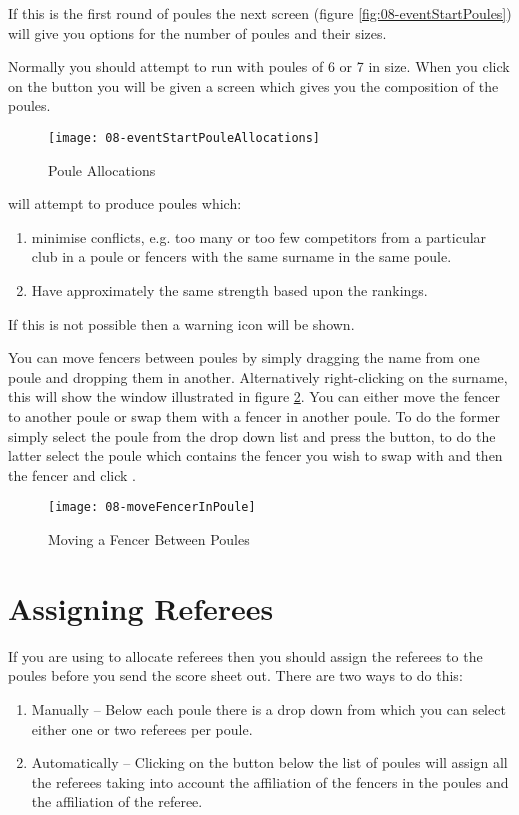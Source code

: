 \documentclass[a4paper,11pt]{memoir}
\begin{document}
If this is the first round of poules the next screen (figure \ref{fig:08-eventStartPoules}) will give you options for the number of poules and their sizes. 

Normally you should attempt to run with poules of 6 or 7 in size. When you click on the  button you will be given a screen which gives you the composition of the poules.

\begin{figure}[!ht]
 \centering
 \texttt{[image: 08-eventStartPouleAllocations]}
 \caption{Poule Allocations} \label{fig:08-eventStartPouleAllocations}
\end{figure}

\fencingtime{} will attempt to produce poules which:

\begin{enumerate}
 \item minimise conflicts, e.g. too many or too few competitors from a particular club in a poule or fencers with the same surname in the same poule.
 \item Have approximately the same strength based upon the rankings.
\end{enumerate}

If this is not possible then a warning icon will be shown. 

You can move fencers between poules by simply dragging the name from one poule and dropping them in another. Alternatively right-clicking on the surname, this will show the window illustrated in figure \ref{fig:08-moveFencerInPoule}. You can either move the fencer to another poule or swap them with a fencer in another poule. To do the former simply select the poule from the drop down list and press the  button, to do the latter select the poule which contains the fencer you wish to swap with and then the fencer and click .

\begin{figure}[!ht]
 \centering
 \texttt{[image: 08-moveFencerInPoule]}
 \caption{Moving a Fencer Between Poules} \label{fig:08-moveFencerInPoule}
\end{figure}

\section{Assigning Referees}

If you are using \fencingtime{} to allocate referees then you should assign the referees to the poules before you send the score sheet out. There are two ways to do this:
\begin{enumerate}
 \item Manually -- Below each poule there is a drop down from which you can select either one or two referees per poule.
 \item Automatically -- Clicking on the  button below the list of poules will assign all the referees taking into account the affiliation of the fencers in the poules and the affiliation of the referee.
\end{enumerate}
\end{document}
